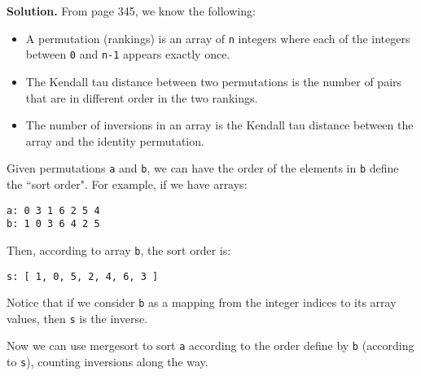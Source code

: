 \documentclass[12pt, a4paper]{article}
\newenvironment{sol}[1][Solution]
{\par\medskip\noindent \textbf{#1.} }
{\medskip}
\begin{document}
	\begin{sol}
		From page 345, we know the following:
		\begin{itemize}
			\item A permutation (rankings) is an array of \texttt{n} integers where each of
			the integers between \texttt{0} and \texttt{n-1} appears exactly once.
			\item The Kendall tau distance between two permutations is the number of pairs
			that are in different order in the two rankings.
			\item The number of inversions in an array is the Kendall tau distance between
			the array and the identity permutation.
		\end{itemize}
		Given permutations \texttt{a} and \texttt{b}, we can have the order of the elements
		in \texttt{b} define the ``sort order". For example, if we have arrays:
		\begin{lstlisting}[language={}]
a: 0 3 1 6 2 5 4
b: 1 0 3 6 4 2 5
		\end{lstlisting}
		Then, according to array \texttt{b}, the sort order is:
		\begin{lstlisting}[language={}]
s: [ 1, 0, 5, 2, 4, 6, 3 ]
		\end{lstlisting}
		Notice that if we consider \texttt{b} as a mapping from the integer indices
		to its array values, then \texttt{s} is the inverse.
		
		Now we can use mergesort to sort \texttt{a} according to the order define
		by \texttt{b} (according to \texttt{s}), counting inversions along the
		way.
	\end{sol}
	\pagebreak
	\printbibliography
\end{document}
